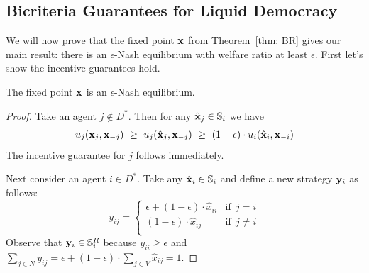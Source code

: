 


\subsection{Bicriteria Guarantees for Liquid Democracy}\label{sec:bounds}

We will now prove that the fixed point ${\bf x}$ from Theorem~\ref{thm: BR} gives our main result: there is an $\epsilon$-Nash equilibrium
with welfare ratio at least $\epsilon$. First let's show the incentive guarantees hold.
\begin{lem}\label{lem:approx-NE}
The fixed point ${\bf x}$ is an $\epsilon$-Nash equilibrium.
\end{lem} 
\begin{proof}
Take an agent $j\notin D^*$. Then for any $\hat{{\bf x}}_j \in \mathbb{S}_i$ we have
$$u_{j}(\x_j,\x_{-j})\ \geq\ u_{j}(\hat{\x}_j,\x_{-j}) \ \geq\ (1-\epsilon)\cdot u_i(\hat{\x}_i,\x_{-i})$$ 
The incentive guarantee for $j$ follows immediately.
%

Next consider an agent $i\in D^*$. Take any $\hat{{\bf x}}_i\in \mathbb{S}_i$ and define a new strategy ${\bf y}_i$ as follows:
		$$
		y_{ij}=
		\begin{cases}
		\epsilon+ (1-\epsilon) \cdot \hat{x}_{ii} &\text{if} \ \ j=i \\ 
		(1-\epsilon)\cdot  \hat{x}_{ij}  &\text{if} \ \ j\neq i \\ 
		\end{cases}
		$$ 
Observe that ${\bf y}_i\in \mathbb{S}^R_i$ because $y_{ii}\geq \epsilon$ and 
$\sum_{j\in N} y_{ij}= \epsilon+(1-\epsilon)\cdot \sum_{j\in V} \hat{x}_{ij} =1$. 
		

\end{proof}
